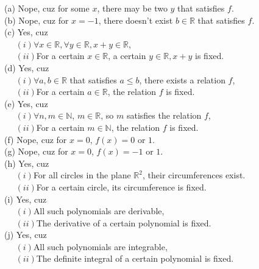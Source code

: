 \documentclass[11pt, a4paper, UTF8]{ctexart}
\begin{document}


\begin{solution}
  (a) Nope, cuz for some $x$, there may be two $y$ that satisfies $f$.\\
  (b) Nope, cuz for $x = -1$, there doesn't exist $b \in \mathbb{R}$ that satisfies $f$.\\
  (c) Yes, cuz\\
  $~~~~~~(i)\forall x \in \mathbb{R}, \forall y \in \mathbb{R}, x + y \in \mathbb{R}$,\\
  $~~~~~~(ii)$For a certain $x \in \mathbb{R}$, a certain $y \in \mathbb{R}, x + y$ is fixed.\\
  (d) Yes, cuz\\
  $~~~~~~(i)\forall a,b \in \mathbb{R}$ that satisfies $a \leq b$, there exists a relation $f$,\\
  $~~~~~~(ii)$For a certain $a \in \mathbb{R}$, the relation $f$ is fixed.\\
  (e) Yes, cuz\\
  $~~~~~~(i)\forall n,m \in \mathbb{N}$, $m \in \mathbb{R}$, so $m$ satisfies the relation $f$,\\
  $~~~~~~(ii)$For a certain $m \in \mathbb{N}$, the relation $f$ is fixed.\\
  (f) Nope, cuz for $x = 0$, $f(x) = 0$ or $1$.\\
  (g) Nope, cuz for $x = 0$, $f(x) = -1$ or $1$.\\
  (h) Yes, cuz\\
  $~~~~~~(i)$For all circles in the plane $\mathbb{R}^{2}$, their circumferences exist.\\
  $~~~~~~(ii)$For a certain circle, its circumference is fixed.\\
  (i) Yes, cuz\\
  $~~~~~~(i)$All such polynomials are derivable,\\
  $~~~~~~(ii)$The derivative of a certain polynomial is fixed.\\
  (j) Yes, cuz\\
  $~~~~~~(i)$All such polynomials are integrable,\\
  $~~~~~~(ii)$The definite integral of a certain polynomial is fixed.
\end{solution}
\end{document}
